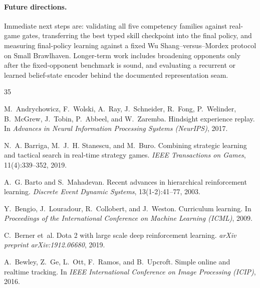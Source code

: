 \documentclass[11pt,a4paper]{article}
\begin{document}
\paragraph{Future directions.}
Immediate next steps are: validating all five competency families against real-game gates, transferring the best typed skill checkpoint into the final policy, and measuring final-policy learning against a fixed Wu Shang--versus--Mordex protocol on Small Brawlhaven.
Longer-term work includes broadening opponents only after the fixed-opponent benchmark is sound, and evaluating a recurrent or learned belief-state encoder behind the documented representation seam.



\begin{thebibliography}{35}

M.~Andrychowicz, F.~Wolski, A.~Ray, J.~Schneider, R.~Fong, P.~Welinder, B.~McGrew, J.~Tobin, P.~Abbeel, and W.~Zaremba.
\newblock Hindsight experience replay.
\newblock In \emph{Advances in Neural Information Processing Systems (NeurIPS)}, 2017.

N.~A. Barriga, M.~J.~H. Stanescu, and M.~Buro.
\newblock Combining strategic learning and tactical search in real-time strategy games.
\newblock \emph{IEEE Transactions on Games}, 11(4):339--352, 2019.

A.~G. Barto and S.~Mahadevan.
\newblock Recent advances in hierarchical reinforcement learning.
\newblock \emph{Discrete Event Dynamic Systems}, 13(1-2):41--77, 2003.

Y.~Bengio, J.~Louradour, R.~Collobert, and J.~Weston.
\newblock Curriculum learning.
\newblock In \emph{Proceedings of the International Conference on Machine Learning (ICML)}, 2009.

C.~Berner et~al.
\newblock Dota 2 with large scale deep reinforcement learning.
\newblock \emph{arXiv preprint arXiv:1912.06680}, 2019.

A.~Bewley, Z.~Ge, L.~Ott, F.~Ramos, and B.~Upcroft.
\newblock Simple online and realtime tracking.
\newblock In \emph{IEEE International Conference on Image Processing (ICIP)}, 2016.


\end{thebibliography}
\end{document}
